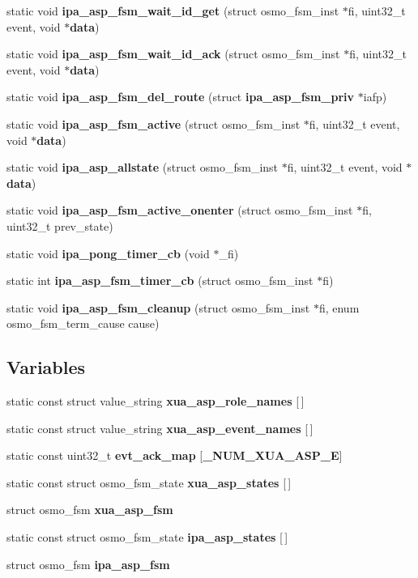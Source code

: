 \begin{DoxyCompactItemize}
\item 
static void {\bf ipa\+\_\+asp\+\_\+fsm\+\_\+wait\+\_\+id\+\_\+get} (struct osmo\+\_\+fsm\+\_\+inst $\ast$fi, uint32\+\_\+t event, void $\ast${\bf data})
\item 
static void {\bf ipa\+\_\+asp\+\_\+fsm\+\_\+wait\+\_\+id\+\_\+ack} (struct osmo\+\_\+fsm\+\_\+inst $\ast$fi, uint32\+\_\+t event, void $\ast${\bf data})
\item 
static void {\bf ipa\+\_\+asp\+\_\+fsm\+\_\+del\+\_\+route} (struct {\bf ipa\+\_\+asp\+\_\+fsm\+\_\+priv} $\ast$iafp)
\item 
static void {\bf ipa\+\_\+asp\+\_\+fsm\+\_\+active} (struct osmo\+\_\+fsm\+\_\+inst $\ast$fi, uint32\+\_\+t event, void $\ast${\bf data})
\item 
static void {\bf ipa\+\_\+asp\+\_\+allstate} (struct osmo\+\_\+fsm\+\_\+inst $\ast$fi, uint32\+\_\+t event, void $\ast${\bf data})
\item 
static void {\bf ipa\+\_\+asp\+\_\+fsm\+\_\+active\+\_\+onenter} (struct osmo\+\_\+fsm\+\_\+inst $\ast$fi, uint32\+\_\+t prev\+\_\+state)
\item 
static void {\bf ipa\+\_\+pong\+\_\+timer\+\_\+cb} (void $\ast$\+\_\+fi)
\item 
static int {\bf ipa\+\_\+asp\+\_\+fsm\+\_\+timer\+\_\+cb} (struct osmo\+\_\+fsm\+\_\+inst $\ast$fi)
\item 
static void {\bf ipa\+\_\+asp\+\_\+fsm\+\_\+cleanup} (struct osmo\+\_\+fsm\+\_\+inst $\ast$fi, enum osmo\+\_\+fsm\+\_\+term\+\_\+cause cause)
\end{DoxyCompactItemize}
\subsection*{Variables}
\begin{DoxyCompactItemize}
\item 
static const struct value\+\_\+string {\bf xua\+\_\+asp\+\_\+role\+\_\+names} [$\,$]
\item 
static const struct value\+\_\+string {\bf xua\+\_\+asp\+\_\+event\+\_\+names} [$\,$]
\item 
static const uint32\+\_\+t {\bf evt\+\_\+ack\+\_\+map} [{\bf \+\_\+\+N\+U\+M\+\_\+\+X\+U\+A\+\_\+\+A\+S\+P\+\_\+E}]
\item 
static const struct osmo\+\_\+fsm\+\_\+state {\bf xua\+\_\+asp\+\_\+states} [$\,$]
\item 
struct osmo\+\_\+fsm {\bf xua\+\_\+asp\+\_\+fsm}
\item 
static const struct osmo\+\_\+fsm\+\_\+state {\bf ipa\+\_\+asp\+\_\+states} [$\,$]
\item 
struct osmo\+\_\+fsm {\bf ipa\+\_\+asp\+\_\+fsm}
\end{DoxyCompactItemize}


